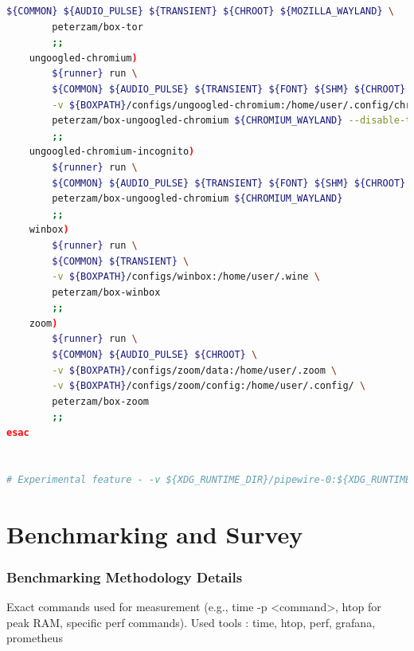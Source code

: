 \documentclass[journal,onecolumn]{IEEEtran}
\begin{document}
\begin{lstlisting}[language=Bash]
        ${COMMON} ${AUDIO_PULSE} ${TRANSIENT} ${CHROOT} ${MOZILLA_WAYLAND} \
        peterzam/box-tor
        ;;
    ungoogled-chromium)
        ${runner} run \
        ${COMMON} ${AUDIO_PULSE} ${TRANSIENT} ${FONT} ${SHM} ${CHROOT} \
        -v ${BOXPATH}/configs/ungoogled-chromium:/home/user/.config/chromium \
        peterzam/box-ungoogled-chromium ${CHROMIUM_WAYLAND} --disable-top-sites
        ;;
    ungoogled-chromium-incognito)
        ${runner} run \
        ${COMMON} ${AUDIO_PULSE} ${TRANSIENT} ${FONT} ${SHM} ${CHROOT} \
        peterzam/box-ungoogled-chromium ${CHROMIUM_WAYLAND}
        ;;
    winbox)
        ${runner} run \
        ${COMMON} ${TRANSIENT} \
		-v ${BOXPATH}/configs/winbox:/home/user/.wine \
        peterzam/box-winbox
        ;;
    zoom)
        ${runner} run \
        ${COMMON} ${AUDIO_PULSE} ${CHROOT} \
	    -v ${BOXPATH}/configs/zoom/data:/home/user/.zoom \
	    -v ${BOXPATH}/configs/zoom/config:/home/user/.config/ \
        peterzam/box-zoom
        ;;
esac


# Experimental feature - -v ${XDG_RUNTIME_DIR}/pipewire-0:${XDG_RUNTIME_DIR}/pipewire-0 \

\end{lstlisting}

\section{Benchmarking and Survey}
\subsubsection{Benchmarking Methodology Details} 
Exact commands used for measurement (e.g., time -p <command>, htop for peak RAM, specific perf commands).
Used tools : time, htop, perf, grafana, prometheus
\end{document}
